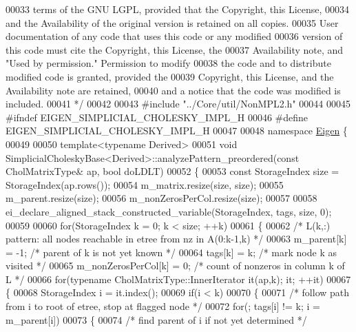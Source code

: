 \begin{DoxyCode}
00033 \textcolor{comment}{    terms of the GNU LGPL, provided that the Copyright, this License,}
00034 \textcolor{comment}{    and the Availability of the original version is retained on all copies.}
00035 \textcolor{comment}{    User documentation of any code that uses this code or any modified}
00036 \textcolor{comment}{    version of this code must cite the Copyright, this License, the}
00037 \textcolor{comment}{    Availability note, and "Used by permission." Permission to modify}
00038 \textcolor{comment}{    the code and to distribute modified code is granted, provided the}
00039 \textcolor{comment}{    Copyright, this License, and the Availability note are retained,}
00040 \textcolor{comment}{    and a notice that the code was modified is included.}
00041 \textcolor{comment}{ */}
00042 
00043 \textcolor{preprocessor}{#include "../Core/util/NonMPL2.h"}
00044 
00045 \textcolor{preprocessor}{#ifndef EIGEN\_SIMPLICIAL\_CHOLESKY\_IMPL\_H}
00046 \textcolor{preprocessor}{#define EIGEN\_SIMPLICIAL\_CHOLESKY\_IMPL\_H}
00047 
00048 \textcolor{keyword}{namespace }\hyperlink{namespace_eigen}{Eigen} \{
00049 
00050 \textcolor{keyword}{template}<\textcolor{keyword}{typename} Derived>
00051 \textcolor{keywordtype}{void} SimplicialCholeskyBase<Derived>::analyzePattern\_preordered(\textcolor{keyword}{const} CholMatrixType& ap, \textcolor{keywordtype}{bool} doLDLT)
00052 \{
00053   \textcolor{keyword}{const} StorageIndex size = StorageIndex(ap.rows());
00054   m\_matrix.resize(size, size);
00055   m\_parent.resize(size);
00056   m\_nonZerosPerCol.resize(size);
00057 
00058   ei\_declare\_aligned\_stack\_constructed\_variable(StorageIndex, tags, size, 0);
00059 
00060   \textcolor{keywordflow}{for}(StorageIndex k = 0; k < size; ++k)
00061   \{
00062     \textcolor{comment}{/* L(k,:) pattern: all nodes reachable in etree from nz in A(0:k-1,k) */}
00063     m\_parent[k] = -1;             \textcolor{comment}{/* parent of k is not yet known */}
00064     tags[k] = k;                  \textcolor{comment}{/* mark node k as visited */}
00065     m\_nonZerosPerCol[k] = 0;      \textcolor{comment}{/* count of nonzeros in column k of L */}
00066     \textcolor{keywordflow}{for}(\textcolor{keyword}{typename} CholMatrixType::InnerIterator it(ap,k); it; ++it)
00067     \{
00068       StorageIndex i = it.index();
00069       \textcolor{keywordflow}{if}(i < k)
00070       \{
00071         \textcolor{comment}{/* follow path from i to root of etree, stop at flagged node */}
00072         \textcolor{keywordflow}{for}(; tags[i] != k; i = m\_parent[i])
00073         \{
00074           \textcolor{comment}{/* find parent of i if not yet determined */}

\end{DoxyCode}
